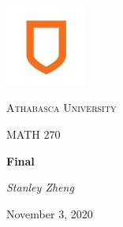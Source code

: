 \documentclass[11pt, letterpaper, twoside]{article}
\begin{document}
\begin{titlepage}
\centering
\vspace*{60px}
\hspace{0pt}
\includegraphics[width=0.2\textwidth]{logo}\par\vspace{1cm}
{\scshape\LARGE Athabasca University \par}
\vspace{1cm}
{\scshape\Large MATH 270\par}
\vspace{1.5cm}
{\huge\bfseries Final\par}
\vspace{2cm}
{\Large\itshape Stanley Zheng\par}
\vfill
{\large November 3, 2020\par}
\vspace*{50px}
\hspace{0pt}
\pagebreak
\end{titlepage}
\end{document}
